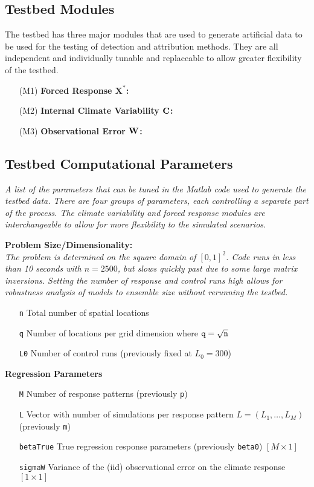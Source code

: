 \documentclass[11pt]{article}
\newcommand{\C}{\ensuremath{\text{Cov}}}
\def\*#1{\bm{#1}}
\def\C{\textbf{\text{C}}}
\def\W{\textbf{\text{W}}}
\begin{document}
\subsection{Testbed Modules}
The testbed has three major modules that are used to generate artificial data to be used for the testing of detection and attribution methods. They are all independent and individually tunable and replaceable to allow greater flexibility of the testbed. 
\begin{enumerate}
\item[(M1)] \textbf{Forced Response $\*X^*$:}
\item[(M2)]  \textbf{Internal Climate Variability $\C$:}
\item[(M3)]  \textbf{Observational Error $\W$:}
\end{enumerate}


\newpage
\subsection{Testbed Computational Parameters}
\emph{A list of the parameters that can be tuned in the Matlab code used to generate the testbed data. There are four groups of parameters, each controlling a separate part of the process. The climate variability and forced response modules are interchangeable to allow for more flexibility to the simulated scenarios.}

\textbf{Problem Size/Dimensionality:} \\
\emph{The problem is determined on the square domain of $[0,1]^2$. Code runs in less than 10 seconds with $n=2500$, but slows quickly past due to some large matrix inversions. Setting the number of response and control runs high allows for robustness analysis of models to ensemble size without rerunning the testbed.}
\begin{itemize}
\item[ \texttt{n}] Total number of spatial locations 
\item[\texttt{q}] Number of locations per grid dimension where $\text{\texttt{q}} = \sqrt{\text{\texttt{n}}}$
\item[\texttt{L0}] Number of control runs (previously fixed at $L_0 = 300$)
\end{itemize}


\textbf{Regression Parameters}
\begin{itemize}
\item[\texttt{M}] Number of response patterns  (previously \texttt{p})
\item[\texttt{L}] Vector with number of simulations per response pattern $L = (L_1, \dots, L_M)$  (previously \texttt{m})
\item[ \texttt{betaTrue}] True regression response parameters (previously \texttt{beta0}) $[M \times 1]$
\item[\texttt{sigmaW}] Variance of the (iid) observational error on the climate response $[1 \times 1]$
\end{itemize}
\end{document}
